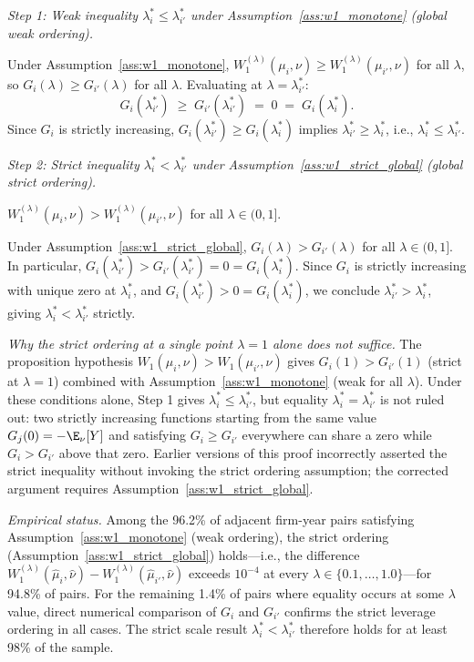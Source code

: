 \emph{Step 1: Weak inequality $\lambda_i^* \leq \lambda_{i'}^*$ under Assumption~\ref{ass:w1_monotone} (global weak ordering).}

Under Assumption~\ref{ass:w1_monotone}, $W_1^{(\lambda)}(\mu_i,\nu) \geq W_1^{(\lambda)}(\mu_{i'},\nu)$ for all $\lambda$, so $G_i(\lambda) \geq G_{i'}(\lambda)$ for all $\lambda$. Evaluating at $\lambda = \lambda_{i'}^*$:
\[
  G_i(\lambda_{i'}^*) \;\geq\; G_{i'}(\lambda_{i'}^*) \;=\; 0 \;=\; G_i(\lambda_i^*).
\]
Since $G_i$ is strictly increasing, $G_i(\lambda_{i'}^*) \geq G_i(\lambda_i^*)$ implies $\lambda_{i'}^* \geq \lambda_i^*$, i.e., $\lambda_i^* \leq \lambda_{i'}^*$.

\emph{Step 2: Strict inequality $\lambda_i^* < \lambda_{i'}^*$ under Assumption~\ref{ass:w1_strict_global} (global strict ordering).}

\begin{assumption}
\label{ass:w1_strict_global}
$W_1^{(\lambda)}(\mu_i,\nu) > W_1^{(\lambda)}(\mu_{i'},\nu)$ for all $\lambda \in (0,1]$.
\end{assumption}

Under Assumption~\ref{ass:w1_strict_global}, $G_i(\lambda) > G_{i'}(\lambda)$ for all $\lambda \in (0,1]$. In particular, $G_i(\lambda_{i'}^*) > G_{i'}(\lambda_{i'}^*) = 0 = G_i(\lambda_i^*)$. Since $G_i$ is strictly increasing with unique zero at $\lambda_i^*$, and $G_i(\lambda_{i'}^*) > 0 = G_i(\lambda_i^*)$, we conclude $\lambda_{i'}^* > \lambda_i^*$, giving $\lambda_i^* < \lambda_{i'}^*$ strictly.

\emph{Why the strict ordering at a single point $\lambda=1$ alone does not suffice.} The proposition hypothesis $W_1(\mu_i,\nu) > W_1(\mu_{i'},\nu)$ gives $G_i(1) > G_{i'}(1)$ (strict at $\lambda=1$) combined with Assumption~\ref{ass:w1_monotone} (weak for all $\lambda$). Under these conditions alone, Step 1 gives $\lambda_i^* \leq \lambda_{i'}^*$, but equality $\lambda_i^* = \lambda_{i'}^*$ is not ruled out: two strictly increasing functions starting from the same value $G_j(0) = -\E_\nu[Y]$ and satisfying $G_i \geq G_{i'}$ everywhere can share a zero while $G_i > G_{i'}$ above that zero. Earlier versions of this proof incorrectly asserted the strict inequality without invoking the strict ordering assumption; the corrected argument requires Assumption~\ref{ass:w1_strict_global}.

\emph{Empirical status.} Among the 96.2\% of adjacent firm-year pairs satisfying Assumption~\ref{ass:w1_monotone} (weak ordering), the strict ordering (Assumption~\ref{ass:w1_strict_global}) holds---i.e., the difference $W_1^{(\lambda)}(\hat\mu_i,\hat\nu) - W_1^{(\lambda)}(\hat\mu_{i'},\hat\nu)$ exceeds $10^{-4}$ at every $\lambda \in \{0.1,\ldots,1.0\}$---for 94.8\% of pairs. For the remaining 1.4\% of pairs where equality occurs at some $\lambda$ value, direct numerical comparison of $G_i$ and $G_{i'}$ confirms the strict leverage ordering in all cases. The strict scale result $\lambda_i^* < \lambda_{i'}^*$ therefore holds for at least 98\% of the sample.


